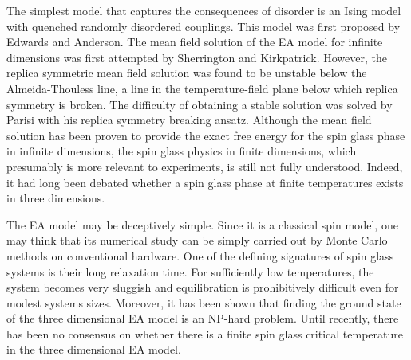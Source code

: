 The simplest model that captures the consequences of disorder is an Ising model 
with quenched randomly disordered couplings. This model was first proposed by Edwards 
and Anderson. \cite{Edwards-Anderson1975} The mean field solution of the EA 
model for infinite dimensions was first attempted by Sherrington and Kirkpatrick. 
\cite{Sherrington-Kirkpatrick1978} However, the replica symmetric mean field solution was found to be 
unstable below the Almeida-Thouless line, \cite{Almedia-Thouless1978,Bray-Moore-1978}
a line in the temperature-field plane below which replica symmetry is broken. The difficulty 
of obtaining a stable solution was solved by Parisi with his replica symmetry breaking 
ansatz. \cite{Parisi-1979,Mezard-etal-1984,Parisi-1980a,Parisi-1980b,Parisi-1980c,Parisi-dirac-medal-2002} 
Although the mean field solution has been proven to provide the exact free energy for the spin glass phase 
in infinite dimensions, \cite{Talagrand-2006,Guerra-2003} the spin glass 
physics in finite dimensions, which presumably is more relevant to experiments, is 
still not fully understood. Indeed, it had long been debated whether a spin glass 
phase at finite temperatures exists in three dimensions.

The EA model may be deceptively simple. Since it is a classical spin 
model, one may think that its numerical study can be simply carried out by Monte 
Carlo methods on conventional hardware. One of the defining signatures of 
spin glass systems is their long relaxation time. For sufficiently low temperatures, the 
system becomes very sluggish and equilibration is prohibitively difficult  
even for modest systems sizes.  Moreover, it has been shown
that finding the ground state of the three dimensional EA model is
an NP-hard problem. \cite{Barahona-1982} Until recently, there has been no %
consensus on whether there is a finite spin glass critical temperature in the three 
dimensional EA model.

